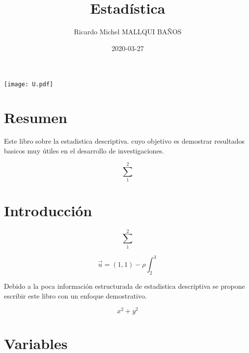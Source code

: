 \documentclass[10pt,]{krantz}
\title{Estadística}
\author{Ricardo Michel MALLQUI BAÑOS}
\institute{Universidad Nacional San Cristóbal De Huamanga}
\date{2020-03-27}
\let\oldincludegraphics\includegraphics
\renewcommand\includegraphics[2][]{%
  \oldincludegraphics[scale=0.85]{#2}
}
\theoremstyle{definition}
\theoremstyle{definition}
\theoremstyle{definition}
\theoremstyle{remark}
\begin{document}
\maketitle

\thispagestyle{empty}
\begin{center}
\texttt{[image: U.pdf]}
\end{center}


{
\hypersetup{linkcolor=}
\setcounter{tocdepth}{2}
\tableofcontents
}
\listoftables
\listoffigures
\newcommand{\N}{\mathbb{N}}
\newcommand{\R}{\mathbb{R}}
\newcommand{\CC}{\mathbb{C}}
\newcommand{\I}{\mathbb{I}}
\newcommand{\f}{\mathbb{f}}
\newcommand{\X}{\mathbb{X}}
\newcommand{\D}{\mathbb{D}}
\newcommand{\Z}{\mathbb{Z}}
\newcommand{\Q}{\mathbb{Q}}
\newcommand{\norm}[1]{\left\Vert#1\right\Vert}
\newcommand{\abs}[1]{\left\vert#1\right\vert}
\newcommand{\set}[1]{\left\{#1\right\}}
\newcommand{\seq}[1]{\left<#1\right>}
\newcommand{\co}[1]{\left[#1\right]}
\newcommand{\cc}[1]{\left(#1\right)}
\newcommand{\J}{\mathcal{J}}
\newcommand{\K}{\mathcal{K}}
\newcommand{\M}{\mathcal{M}}
\newcommand{\F}{\mathcal{F}}

\hypertarget{resumen}{%
\chapter*{Resumen}\label{resumen}}


Este libro sobre la estadistica descriptiva. cuyo objetivo es demostrar resultados basicos muy útiles en el desarrollo de investigaciones.

\[\sum_1^2\]

\hypertarget{introducciuxf3n}{%
\chapter*{Introducción}\label{introducciuxf3n}}


\[\sum_1^2\]

\[\vec{u}=(1,1)-\rho\int_2^3\]

Debido a la poca información estructurada de estadistica descriptiva se propone escribir este libro con un enfoque demostrativo.

\[x^2+y^2\]

\mainmatter

\hypertarget{variables}{%
\chapter{Variables}\label{variables}}
\end{document}
